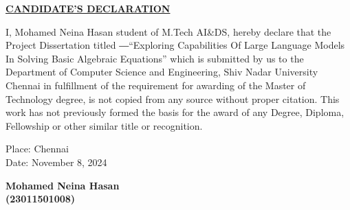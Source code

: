 \documentclass[12pt,a4paper]{report}
\begin{document}
\newpage



\begin{center}
\begin{center}
\end{center}
\vspace{2 cm}
\textbf{\underline{CANDIDATE’S DECLARATION}}\\
\end{center}
\vspace{1.2cm}
I, Mohamed Neina Hasan student of M.Tech AI\&DS, hereby declare that the Project Dissertation titled ―“Exploring Capabilities Of Large Language Models In Solving Basic Algebraic Equations” which is submitted by us to the Department of Computer Science and Engineering, Shiv Nadar University Chennai in fulfillment of the requirement for awarding of the Master of Technology degree, is not copied from any source without proper citation. This work has not previously formed the basis for the award of any Degree, Diploma, Fellowship or other similar title or recognition.

\noindent \begin{minipage}{4cm}
\begin{flushleft}
\vspace{5 cm}
                         
Place: Chennai\\
Date: November 8, 2024\\

\end{flushleft} 
\end{minipage}
\hfill
\begin{minipage}{12cm}
\begin{flushright}                                      
\vspace{5 cm}
\vspace{1cm}
\textbf{Mohamed Neina Hasan} \\
\vspace{0.2cm}
\textbf{(23011501008)}\\
\vspace{1cm}




\end{flushright} 
\end{minipage}
\end{document}
